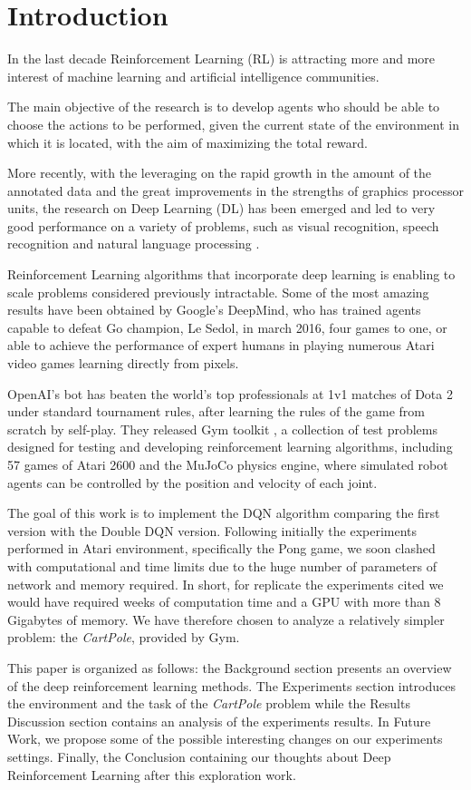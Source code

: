 \section{Introduction}

In the last decade Reinforcement Learning (RL) is attracting more and more interest of machine learning and artificial intelligence communities.

The main objective of the research is to develop agents who should be able to choose the actions to be performed, given the current state of the environment in which it is located, with the aim of maximizing the total reward.

More recently, with the leveraging on the rapid growth in the amount of the annotated data and the great improvements in the strengths of graphics processor units, the research on  Deep Learning (DL) has been emerged and led to very good performance on a variety of problems, such as visual recognition, speech recognition and natural language processing \cite{AdvancesCNN}.

Reinforcement Learning algorithms that incorporate deep learning is enabling to scale problems considered previously intractable. Some of the most amazing results have been obtained by Google’s DeepMind, who has trained agents capable to defeat Go champion, Le Sedol, in march 2016, four games to one, or able to achieve the performance of expert humans in playing numerous Atari video games learning directly from pixels.

OpenAI's bot has beaten the world's top professionals at 1v1 matches of Dota 2 under standard tournament rules, after learning the rules of the game from scratch by self-play.
They released Gym toolkit \cite{Gym}, a collection of test problems designed for testing and developing reinforcement learning algorithms, including 57 games of Atari 2600 and the MuJoCo physics engine, where simulated robot agents can be controlled by the position and velocity of each joint. 

The goal of this work is to implement the DQN algorithm comparing the first version with the Double DQN version. Following initially the experiments performed in Atari environment, specifically the Pong game, we soon clashed with computational and time limits due to the huge number of parameters of network and memory required. In short, for replicate the experiments cited we would have required weeks of computation time and a GPU with more than 8 Gigabytes of memory. We have therefore chosen to analyze a relatively simpler problem: the \textit{CartPole}, provided by Gym.

This paper is organized as follows: the Background section presents an overview of the deep reinforcement learning methods. The Experiments section introduces the environment and the task of the \textit{CartPole} problem while the Results Discussion section contains an analysis of the experiments results. In Future Work, we propose some of the possible interesting changes on our experiments settings. Finally, the Conclusion containing our thoughts about Deep Reinforcement Learning after this exploration work.
